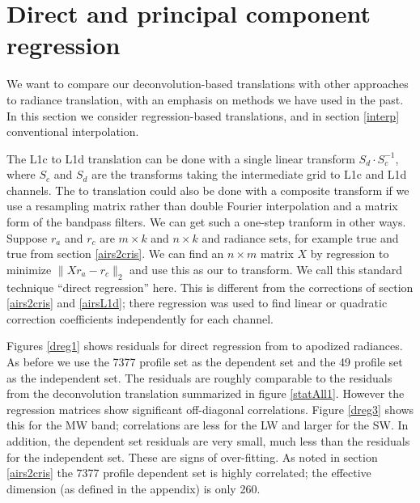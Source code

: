 \documentclass[journal]{IEEEtran}
\begin{document}
\section{Direct and principal component regression}
\label{dregr}

We want to compare our deconvolution-based translations with other
approaches to radiance translation, with an emphasis on methods we
have used in the past.  In this section we consider regression-based
translations, and in section \ref{interp} conventional
interpolation.

The {\airs} L1c to L1d translation can be done with a single 
linear transform $S_d\cdot S_c^{-1}$, where $S_c$ and $S_d$ are the
transforms taking the intermediate grid to L1c and L1d channels.
The {\airs} to {\cris} translation could also be done with a
composite transform if we use a resampling matrix rather than
double Fourier interpolation and a matrix form of the bandpass
filters.  We can get such a one-step tranform in other ways.
Suppose $r_a$ and $r_c$ are $m \times k$ and $n \times k$ {\airs}
and {\cris} radiance sets, for example true {\airs} and true {\cris}
from section \ref{airs2cris}.  We can find an $n \times m$ matrix
$X$ by regression to minimize $\|X r_a - r_c\|_2$ and use this as
our {\airs} to {\cris} transform.  We call this standard technique
``direct regression'' here.  This is different from the corrections
of section \ref{airs2cris} and \ref{airsL1d}; there regression was
used to find linear or quadratic correction coefficients
independently for each channel.


Figures \ref{dreg1} shows residuals for direct regression from
{\airs} to apodized {\cris} radiances.  As before we use the 7377
profile set as the dependent set and the 49 profile set as the
independent set.  The residuals are roughly comparable to the
residuals from the deconvolution translation summarized in figure
\ref{statAll1}.  However the regression matrices show significant
off-diagonal correlations.  Figure \ref{dreg3} shows this for the 
MW band; correlations are less for the LW and larger for the SW.  
In addition, the dependent set residuals are very small, much less
than the residuals for the independent set.  These are signs of
over-fitting.  As noted in section \ref{airs2cris} the 7377 profile
dependent set is highly correlated; the effective dimension (as
defined in the appendix) is only 260.
\end{document}
